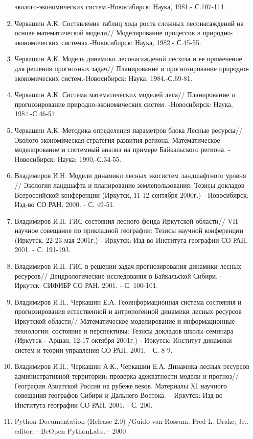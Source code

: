 \documentclass{report}
\begin{document}
\begin{enumerate}
эколого-экономических систем.-Новосибирск: Наука, 1981.- С.107-111.
\item  Черкашин А.К. Составление таблиц хода роста сложных лесонасаждений на основе математической модели//
Моделирование процессов в природно-экономических системах.-Новосибирск: Наука, 1982.- С.45-55.
\item  Черкашин А.К. Модель динамики лесонасаждений лесхоза и ее применение для решения прогнозных задач// Планирование
и прогнозирование природно-экономических систем.-Новосибирск: Наука, 1984.-С.69-81.
\item  Черкашин А.К. Система математических моделей леса// Планирование и прогнозирование природно-экономических систем.
-Новосибирск: Наука, 1984.-С.46-57
\item  Черкашин А.К. Методика определения параметров блока {\textquotedbl}Лесные
ресурсы{\textquotedbl}//Эколого-экономическая стратегия развития региона. Математическое моделирование и системный
анализ на примере Байкальского региона. - Новосибирск: Наука: 1990.-С.34-55.
\item  Владимиров И.Н. Модели динамики лесных экосистем ландшафтного уровня // Экология ландшафта и планирование
землепользования: Тезисы докладов Всероссийской конференции (Иркутск, 11-12 сентября 2000г.) - Новосибирск: Изд-во СО
РАН, 2000. - С. 49-51.
\item  Владимиров И.Н. ГИС состояния лесного фонда Иркутской области// VII научное совещание по прикладной географии:
Тезисы научной конференции (Иркутск, 22-23 мая 2001г.) - Иркутск: Изд-во Института географии СО РАН, 2001. - С.
191-193.
\item  Владимиров И.Н. ГИС в решении задач прогнозирования динамики лесных ресурсов// Дендрологические исследования в
Байкальской Сибири. - Иркутск: СИФИБР СО РАН, 2001. - С. 100-101.
\item  Владимиров И.Н., Черкашин Е.А. Геоинформационная система состояния и прогнозирования естественной и антропогенной
динамики лесных ресурсов Иркутской области// Математическое моделирование и информационные технологии: состояние и
перспективы: Тезисы докладов школы-семинара (Иркутск - Аршан, 12-17 октября 2001г.) - Иркутск: Институт динамики систем
и теории управления СО РАН, 2001. - С. 8-9.
\item  Владимиров И.Н., Черкашин А.К., Черкашин Е.А. Динамика лесных ресурсов административной территории: проверка
адекватности модели и прогноз// География Азиатской России на рубеже веков. Материалы XI научного совещания географов
Сибири и Дальнего Востока. – Иркутск: Изд-во Института географии СО РАН, 2001. - С. 200.
\item  Python Documentation (Release 2.0) /Guido van Rossum, Fred L. Drake, Jr., editor, - BeOpen PythonLabs. - 2000
\end{enumerate}
\end{document}
